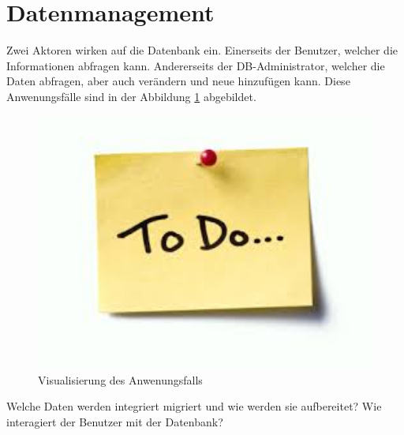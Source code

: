 \section{Datenmanagement}
Zwei Aktoren wirken auf die Datenbank ein. Einerseits der Benutzer, welcher die
Informationen abfragen kann. Andererseits der DB-Administrator, welcher die
Daten abfragen, aber auch verändern und neue hinzufügen kann. Diese
Anwenungsfälle sind in der Abbildung \ref{fig:usecase} abgebildet.
\begin{figure}[htbp]
  \centering
     \includegraphics[width=1\textwidth]{./pictures/todo.jpg}
  \caption{Visualisierung des Anwenungsfalls}
  \label{fig:usecase}
\end{figure}


Welche Daten werden integriert migriert
 und wie werden sie 
aufbereitet?
Wie interagiert der Benutzer mit der Datenbank?